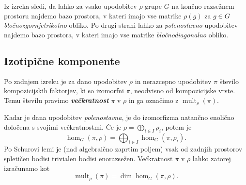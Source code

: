 \documentclass[11pt]{book}
\DeclareMathOperator\mult{mult}
\def\definicija{\color{rdeca}\bf\em}
\theoremstyle{definition}
\theoremstyle{zgled}
\theoremstyle{odprtproblem}
\theoremstyle{domacanaloga}
\theoremstyle{izrek}
\begin{document}
Iz izreka sledi, da lahko za vsako upodobitev $\rho$ grupe $G$ na končno razsežnem prostoru najdemo bazo prostora, v kateri imajo vse matrike $\rho(g)$ za $g \in G$ \emph{bločnozgornjetrikotno} obliko. Po drugi strani lahko za \emph{polenostavno} upodobitev najdemo bazo prostora, v kateri imajo vse matrike \emph{bločnodiagonalno} obliko.

\subsection{Izotipične komponente}

Po zadnjem izreku je za dano upodobitev $\rho$ in nerazcepno upodobitev $\pi$ število kompozicijskih faktorjev, ki so izomorfni $\pi$, neodvisno od kompozicijske vrste. Temu številu pravimo {\definicija večkratnost} $\pi$ v $\rho$ in ga označimo z $\mult_{\rho}(\pi)$. 

Kadar je dana upodobitev \emph{polenostavna}, je do izomorfizma natančno enolično določena s svojimi večkratnostmi. Če je $\rho = \bigoplus_{i \in I} \rho_i$, potem je
\[
    \hom_G(\pi, \rho) = \bigoplus_{i \in I} \hom_G(\pi, \rho_i).
\]
Po Schurovi lemi je (nad algebraično zaprtim poljem) vsak od zadnjih prostorov spletičen bodisi trivialen bodisi enorazsežen. Večkratnost $\pi$ v $\rho$ lahko zatorej izračunamo kot
\[
    \textstyle \mult_{\rho}(\pi) = \dim \hom_G(\pi, \rho).
\]
\end{document}
